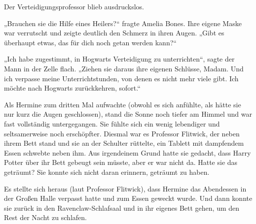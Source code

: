 Der Verteidigungsprofessor blieb ausdruckslos.

„Brauchen sie die Hilfe eines Heilers?“ fragte Amelia Bones.
Ihre eigene Maske war verrutscht und zeigte deutlich den Schmerz in ihren Augen.
„Gibt es überhaupt etwas, das für dich noch getan werden kann?“

„Ich habe zugestimmt, in Hogwarts Verteidigung zu unterrichten“, sagte der Mann in der Zelle flach.
„Ziehen sie daraus ihre eigenen Schlüsse, Madam. Und ich verpasse meine Unterrichtstunden, von denen es nicht mehr viele gibt. Ich möchte nach Hogwarts zurückkehren, sofort.“

\later

Als Hermine zum dritten Mal aufwachte (obwohl es sich anfühlte, als hätte sie nur kurz die Augen geschlossen), stand die Sonne noch tiefer am Himmel und war fast vollständig untergegangen. Sie fühlte sich ein wenig lebendiger und seltsamerweise noch erschöpfter. Diesmal war es Professor Flitwick, der neben ihrem Bett stand und sie an der Schulter rüttelte, ein Tablett mit dampfendem Essen schwebte neben ihm. Aus irgendeinem Grund hatte sie gedacht, dass Harry Potter über ihr Bett gebeugt sein müsste, aber er war nicht da.
Hatte sie das geträumt? Sie konnte sich nicht daran erinnern, geträumt zu haben.

Es stellte sich heraus (laut Professor Flitwick), dass Hermine das Abendessen in der Großen Halle verpasst hatte und zum Essen geweckt wurde. Und dann konnte sie zurück in den Ravenclaw-Schlafsaal und in ihr eigenes Bett gehen, um den Rest der Nacht zu schlafen.

